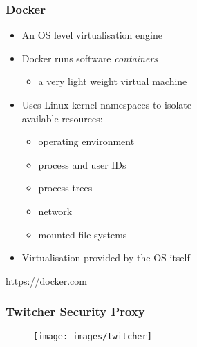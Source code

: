 \documentclass{beamer}
\begin{document}
\begin{frame}
\frametitle<presentation>{Docker}


\begin{itemize}
  \item An OS level virtualisation engine
  \item Docker runs software \textit{containers}
  \begin{itemize} \item a very light weight virtual machine \end{itemize}
  \item Uses Linux kernel namespaces to isolate\\ available resources:
  \begin{itemize}
    \item operating environment
    \item process and user IDs
    \item process trees
    \item network
	\item mounted file systems
  \end{itemize}
  \item Virtualisation provided by the OS itself
\end{itemize}

\centering
\footnotesize{https://docker.com}

\end{frame}

\begin{frame}
\frametitle<presentation>{Twitcher Security Proxy}

  \begin{figure}[ht]
    \centering
    \texttt{[image: images/twitcher]}
  \end{figure}

\end{frame}
\end{document}
